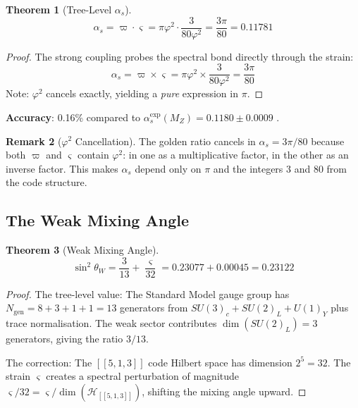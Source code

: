 \documentclass[11pt,a4paper]{article}
\newtheorem{theorem}{Theorem}[section]
\theoremstyle{definition}
\newtheorem{remark}[theorem]{Remark}
\newcommand{\gs}{\varsigma}
\newcommand{\specbond}{\varpi}
\begin{document}
\begin{theorem}[Tree-Level $\alpha_s$]
\label{S1:thm:alpha_s}
\begin{equation}
\alpha_s = \specbond \cdot \gs = \pi\varphi^2 \cdot \frac{3}{80\varphi^2} = \frac{3\pi}{80} = 0.11781
\label{S1:eq:alpha_s}
\end{equation}
\end{theorem}

\begin{proof}
The strong coupling probes the spectral bond directly through the strain:
\begin{equation}
\alpha_s = \specbond \times \gs = \pi\varphi^2 \times \frac{3}{80\varphi^2} = \frac{3\pi}{80}
\end{equation}
Note: $\varphi^2$ cancels exactly, yielding a \emph{pure} expression in $\pi$.
\end{proof}

\textbf{Accuracy}: 0.16\% compared to $\alpha_s^{\mathrm{exp}}(M_Z) = 0.1180 \pm 0.0009$ \cite{PDG2022}.

\begin{remark}[$\varphi^2$ Cancellation]
\label{S1:rem:phi_cancellation}
The golden ratio cancels in $\alpha_s = 3\pi/80$ because both $\specbond$ and $\gs$ contain $\varphi^2$: in one as a multiplicative factor, in the other as an inverse factor. This makes $\alpha_s$ depend only on $\pi$ and the integers 3 and 80 from the code structure.
\end{remark}

\subsection{The Weak Mixing Angle}

\begin{theorem}[Weak Mixing Angle]
\label{S1:thm:sin2theta}
\begin{equation}
\sin^2\theta_W = \frac{3}{13} + \frac{\gs}{32} = 0.23077 + 0.00045 = 0.23122
\label{S1:eq:sin2theta}
\end{equation}
\end{theorem}

\begin{proof}
The tree-level value: The Standard Model gauge group has $N_{\mathrm{gen}} = 8 + 3 + 1 + 1 = 13$ generators from $SU(3)_c + SU(2)_L + U(1)_Y$ plus trace normalisation. The weak sector contributes $\dim(SU(2)_L) = 3$ generators, giving the ratio $3/13$.

The correction: The $[[5,1,3]]$ code Hilbert space has dimension $2^5 = 32$. The strain $\gs$ creates a spectral perturbation of magnitude $\gs/32 = \gs/\dim(\mathcal{H}_{[[5,1,3]]})$, shifting the mixing angle upward.
\end{proof}
\end{document}
